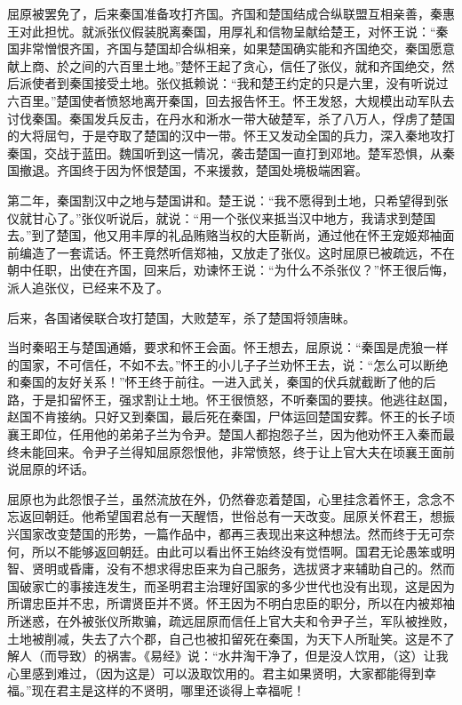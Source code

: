 \documentclass[12pt,UTF-8,openany]{ctexbook}
\begin{document}
\begin{normalsize}
    屈原被罢免了，后来秦国准备攻打齐国。齐国和楚国结成合纵联盟互相亲善，秦惠王对此担忧。就派张仪假装脱离秦国，用厚礼和信物呈献给楚王，对怀王说：“秦国非常憎恨齐国，齐国与楚国却合纵相亲，如果楚国确实能和齐国绝交，秦国愿意献上商、於之间的六百里土地。”楚怀王起了贪心，信任了张仪，就和齐国绝交，然后派使者到秦国接受土地。张仪抵赖说：“我和楚王约定的只是六里，没有听说过六百里。”楚国使者愤怒地离开秦国，回去报告怀王。怀王发怒，大规模出动军队去讨伐秦国。秦国发兵反击，在丹水和淅水一带大破楚军，杀了八万人，俘虏了楚国的大将屈匄，于是夺取了楚国的汉中一带。怀王又发动全国的兵力，深入秦地攻打秦国，交战于蓝田。魏国听到这一情况，袭击楚国一直打到邓地。楚军恐惧，从秦国撤退。齐国终于因为怀恨楚国，不来援救，楚国处境极端困窘。
    
    第二年，秦国割汉中之地与楚国讲和。楚王说：“我不愿得到土地，只希望得到张仪就甘心了。”张仪听说后，就说：“用一个张仪来抵当汉中地方，我请求到楚国去。”到了楚国，他又用丰厚的礼品贿赂当权的大臣靳尚，通过他在怀王宠姬郑袖面前编造了一套谎话。怀王竟然听信郑袖，又放走了张仪。这时屈原已被疏远，不在朝中任职，出使在齐国，回来后，劝谏怀王说：“为什么不杀张仪？”怀王很后悔，派人追张仪，已经来不及了。
    
    后来，各国诸侯联合攻打楚国，大败楚军，杀了楚国将领唐昧。
    
    当时秦昭王与楚国通婚，要求和怀王会面。怀王想去，屈原说：“秦国是虎狼一样的国家，不可信任，不如不去。”怀王的小儿子子兰劝怀王去，说：“怎么可以断绝和秦国的友好关系！”怀王终于前往。一进入武关，秦国的伏兵就截断了他的后路，于是扣留怀王，强求割让土地。怀王很愤怒，不听秦国的要挟。他逃往赵国，赵国不肯接纳。只好又到秦国，最后死在秦国，尸体运回楚国安葬。怀王的长子顷襄王即位，任用他的弟弟子兰为令尹。楚国人都抱怨子兰，因为他劝怀王入秦而最终未能回来。令尹子兰得知屈原怨恨他，非常愤怒，终于让上官大夫在顷襄王面前说屈原的坏话。
    
    屈原也为此怨恨子兰，虽然流放在外，仍然眷恋着楚国，心里挂念着怀王，念念不忘返回朝廷。他希望国君总有一天醒悟，世俗总有一天改变。屈原关怀君王，想振兴国家改变楚国的形势，一篇作品中，都再三表现出来这种想法。然而终于无可奈何，所以不能够返回朝廷。由此可以看出怀王始终没有觉悟啊。国君无论愚笨或明智、贤明或昏庸，没有不想求得忠臣来为自己服务，选拔贤才来辅助自己的。然而国破家亡的事接连发生，而圣明君主治理好国家的多少世代也没有出现，这是因为所谓忠臣并不忠，所谓贤臣并不贤。怀王因为不明白忠臣的职分，所以在内被郑袖所迷惑，在外被张仪所欺骗，疏远屈原而信任上官大夫和令尹子兰，军队被挫败，土地被削减，失去了六个郡，自己也被扣留死在秦国，为天下人所耻笑。这是不了解人（而导致）的祸害。《易经》说：“水井淘干净了，但是没人饮用，（这）让我心里感到难过，（因为这是）可以汲取饮用的。君主如果贤明，大家都能得到幸福。”现在君主是这样的不贤明，哪里还谈得上幸福呢！
    

\end{normalsize}
\end{document}
